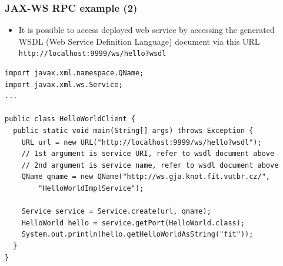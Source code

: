 \documentclass[10pt,xcolor=pdflatex]{beamer}
\begin{document}
\begin{frame}[containsverbatim]\frametitle{JAX-WS RPC example (2)}
\begin{footnotesize}
\begin{itemize}
  \item It is possible to access deployed web service by accessing the generated WSDL (Web Service Definition Language) document via this URL \verb+http://localhost:9999/ws/hello?wsdl+
\end{itemize}
\begin{verbatim}
import javax.xml.namespace.QName;
import javax.xml.ws.Service;
...

public class HelloWorldClient {
  public static void main(String[] args) throws Exception {
    URL url = new URL("http://localhost:9999/ws/hello?wsdl");
    // 1st argument is service URI, refer to wsdl document above
    // 2nd argument is service name, refer to wsdl document above
    QName qname = new QName("http://ws.gja.knot.fit.vutbr.cz/", 
        "HelloWorldImplService");

    Service service = Service.create(url, qname);
    HelloWorld hello = service.getPort(HelloWorld.class);
    System.out.println(hello.getHelloWorldAsString("fit"));
  }
}
\end{verbatim}
\end{footnotesize}
\end{frame}
\end{document}
